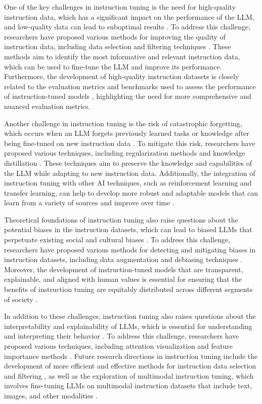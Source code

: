 \documentclass[11pt]{article}
\begin{document}
One of the key challenges in instruction tuning is the need for high-quality instruction data, which has a significant impact on the performance of the LLM, and low-quality data can lead to suboptimal results \cite{ref13}. To address this challenge, researchers have proposed various methods for improving the quality of instruction data, including data selection and filtering techniques \cite{ref9}. These methods aim to identify the most informative and relevant instruction data, which can be used to fine-tune the LLM and improve its performance. Furthermore, the development of high-quality instruction datasets is closely related to the evaluation metrics and benchmarks used to assess the performance of instruction-tuned models \cite{ref144}, highlighting the need for more comprehensive and nuanced evaluation metrics.

Another challenge in instruction tuning is the risk of catastrophic forgetting, which occurs when an LLM forgets previously learned tasks or knowledge after being fine-tuned on new instruction data \cite{ref148}. To mitigate this risk, researchers have proposed various techniques, including regularization methods and knowledge distillation \cite{ref96}. These techniques aim to preserve the knowledge and capabilities of the LLM while adapting to new instruction data. Additionally, the integration of instruction tuning with other AI techniques, such as reinforcement learning and transfer learning, can help to develop more robust and adaptable models that can learn from a variety of sources and improve over time \cite{ref143}.

Theoretical foundations of instruction tuning also raise questions about the potential biases in the instruction datasets, which can lead to biased LLMs that perpetuate existing social and cultural biases \cite{ref11}. To address this challenge, researchers have proposed various methods for detecting and mitigating biases in instruction datasets, including data augmentation and debiasing techniques \cite{ref99}. Moreover, the development of instruction-tuned models that are transparent, explainable, and aligned with human values is essential for ensuring that the benefits of instruction tuning are equitably distributed across different segments of society \cite{ref145}.

In addition to these challenges, instruction tuning also raises questions about the interpretability and explainability of LLMs, which is essential for understanding and interpreting their behavior \cite{ref2}. To address this challenge, researchers have proposed various techniques, including attention visualization and feature importance methods \cite{ref20}. Future research directions in instruction tuning include the development of more efficient and effective methods for instruction data selection and filtering \cite{ref16}, as well as the exploration of multimodal instruction tuning, which involves fine-tuning LLMs on multimodal instruction datasets that include text, images, and other modalities \cite{ref133}.
\end{document}
